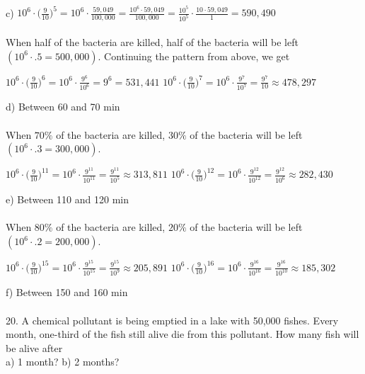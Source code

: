 \documentclass[12pt]{article}
\begin{document}
\\
c) $10^6\cdot \bigg(\displaystyle \frac{9}{10}\bigg)^5=10^6\cdot \displaystyle \frac{59,049}{100,000}=\displaystyle \frac{10^6\cdot59,049}{100,000}=\displaystyle \frac{10^5}{10^5}\cdot \displaystyle \frac{10\cdot59,049}{1}=590,490$ \\
\\
When half of the bacteria are killed, half of the bacteria will be left $(10^6\cdot.5=500,000)$. Continuing the pattern from above, we get
\begin{center}
$10^6\cdot \bigg(\displaystyle \frac{9}{10}\bigg)^6=10^6\cdot \displaystyle \frac{9^6}{10^6}=9^6=531,441$
$10^6\cdot \bigg(\displaystyle \frac{9}{10}\bigg)^7=10^6\cdot \displaystyle \frac{9^7}{10^7}=\displaystyle \frac{9^7}{10}\approx478,297$
\end{center}
d) Between 60 and 70 min \\
\\
When $70\%$ of the bacteria are killed, $30\%$ of the bacteria will be left $(10^6\cdot.3=300,000)$.
\begin{center}
$10^6\cdot \bigg(\displaystyle \frac{9}{10}\bigg)^{11}=10^6\cdot \displaystyle \frac{9^{11}}{10^{11}}=\displaystyle \frac{9^{11}}{10^5}\approx313,811$
$10^6\cdot \bigg(\displaystyle \frac{9}{10}\bigg)^{12}=10^6\cdot \displaystyle \frac{9^{12}}{10^{12}}=\displaystyle \frac{9^{12}}{10^6}\approx282,430$
\end{center}
e) Between 110 and 120 min \\
\\
When $80\%$ of the bacteria are killed, $20\%$ of the bacteria will be left $(10^6\cdot.2=200,000)$. \\
\begin{center}
$10^6\cdot \bigg(\displaystyle \frac{9}{10}\bigg)^{15}=10^6\cdot \displaystyle \frac{9^{15}}{10^{15}}=\displaystyle \frac{9^{15}}{10^9}\approx205,891$
$10^6\cdot \bigg(\displaystyle \frac{9}{10}\bigg)^{16}=10^6\cdot \displaystyle \frac{9^{16}}{10^{16}}=\displaystyle \frac{9^{16}}{10^{10}}\approx185,302$
\end{center}
f) Between 150 and 160 min \\
\\
20. A chemical pollutant is being emptied in a lake with 50,000 fishes. Every month, one-third of the fish still alive die from this pollutant. How many fish will be alive after \\
a) 1 month? \hspace{3.5cm} b) 2 months? \\
\end{document}
